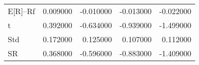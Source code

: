 \begin{tabular}{lrrrr}
\toprule
\midrule
E[R]--Rf & 0.009000 & -0.010000 & -0.013000 & -0.022000 \\
t & 0.392000 & -0.634000 & -0.939000 & -1.499000 \\
Std & 0.172000 & 0.125000 & 0.107000 & 0.112000 \\
SR & 0.368000 & -0.596000 & -0.883000 & -1.409000 \\
\bottomrule
\end{tabular}
